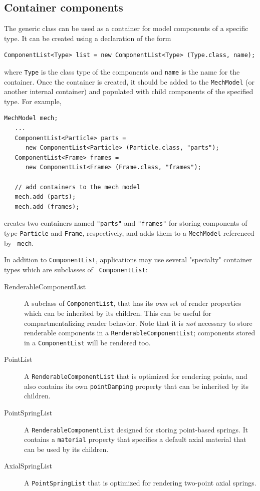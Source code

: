 \subsection{Container components}
\label{ContainerComponents:sec}

The generic class 
can be used as a container for model components of a specific type.
It can be created using a declaration of the form
%
\begin{lstlisting}[]
   ComponentList<Type> list = new ComponentList<Type> (Type.class, name);
\end{lstlisting}
%
where {\tt Type} is the class type of the components and {\tt name} is
the name for the container. Once the container is created, it should
be added to the {\tt MechModel} (or another internal container) and 
populated with child components of the specified type.
For example,
\begin{lstlisting}[]
   MechModel mech; 
   ...
   ComponentList<Particle> parts = 
      new ComponentList<Particle> (Particle.class, "parts");
   ComponentList<Frame> frames = 
      new ComponentList<Frame> (Frame.class, "frames");

   // add containers to the mech model
   mech.add (parts); 
   mech.add (frames);
\end{lstlisting}
creates two containers named {\tt "parts"} and {\tt "frames"} for
storing components of type {\tt Particle} and {\tt Frame},
respectively, and adds them to a {\tt MechModel} referenced by {\tt
mech}.

In addition to {\tt ComponentList}, applications may use several
"specialty" container types which are subclasses of {\tt
ComponentList}:

\begin{description}

\item[RenderableComponentList]\mbox{}

A subclass of {\tt ComponentList}, that
has its {\it own} set of render properties which can be inherited by
its children. This can be useful for compartmentalizing render
behavior.  Note that it is {\it not} necessary to store renderable
components in a {\tt RenderableComponentList}; components stored in a
{\tt ComponentList} will be rendered too.

\item[PointList]\mbox{}

A {\tt RenderableComponentList} that is optimized for
rendering points, and also contains its own {\tt pointDamping}
property that can be inherited by its children.

\item[PointSpringList]\mbox{}

A {\tt RenderableComponentList} designed for
storing point-based springs. It contains a {\tt material} property that
specifies a default axial material that can be used by its children.

\item[AxialSpringList]\mbox{}

A {\tt PointSpringList} that is optimized for
rendering two-point axial springs.

\end{description}

